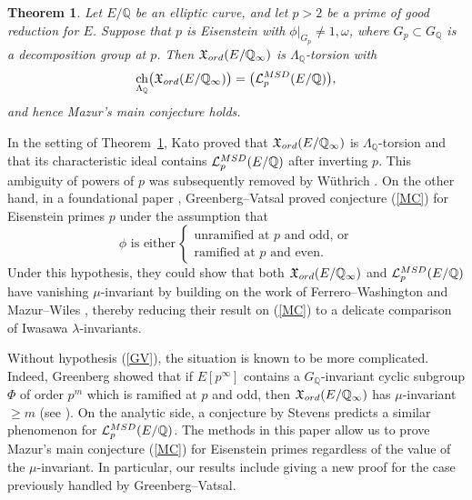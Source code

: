 \documentclass[a4paper,10pt]{amsart}
\numberwithin{equation}{section}
\numberwithin{equation}{section}
\theoremstyle{plain}
\theoremstyle{definition}
\theoremstyle{definition}
\theoremstyle{plain}
\theoremstyle{plain}
\theoremstyle{plain}
\theoremstyle{plain}
\newtheorem{thmintro}{Theorem}
\newcommand{\Q}{\mathbb{Q}}
\newcommand{\X}{\mathfrak{X}}
\DeclareMathOperator{\ch}{ch}
\newcommand{\Lcal}{\mathcal{L}}
\begin{document}

\begin{thmintro}\label{thm:CYC}
Let $E/\Q$ be an elliptic curve, and let $p>2$ be a prime of good reduction  for $E$. Suppose that $p$ is Eisenstein with 
$\phi\vert_{G_p}\neq 1,\omega$, 
where $G_p\subset G_\Q$ is a decomposition group at $p$. Then $\X_{\rm ord}(E/\Q_\infty)$ is $\Lambda_\Q$-torsion with
\[
\ch_{\Lambda_\Q}\bigl(\X_{\rm ord}(E/\Q_\infty)\bigr)\overset{}=\bigl(\Lcal_p^{\rm MSD}(E/\Q)\bigr),
\]
and hence Mazur's main conjecture holds.
\end{thmintro}


In the setting of Theorem~\ref{thm:CYC}, Kato proved \cite{kato-euler-systems} that $\X_{\rm ord}(E/\Q_\infty)$ is $\Lambda_\Q$-torsion and that its characteristic ideal contains $\Lcal_p^{\rm MSD}(E/\Q)$ after inverting $p$. This ambiguity of powers of $p$ was subsequently removed by W\"uthrich \cite{wuthrich-int}. On the other hand, in a foundational paper \cite{greenvats}, Greenberg--Vatsal proved conjecture (\ref{MC}) for Eisenstein primes $p$ under the assumption that
\begin{equation}\label{GV}
\textrm{$\phi$ is either}\,
\begin{cases}
\textrm{unramified at $p$ and odd, or} \\
\textrm{ramified at $p$ and even.}\tag{GV}
\end{cases}
\end{equation}
Under this hypothesis, they could show that both $\X_{\rm ord}(E/\Q_\infty)$ and $\Lcal_p^{\rm MSD}(E/\Q)$ have vanishing $\mu$-invariant by building on the work of Ferrero--Washington \cite{FW} and %
Mazur--Wiles \cite{MW}, thereby reducing their result on (\ref{MC}) to a delicate comparison of Iwasawa $\lambda$-invariants.

Without hypothesis (\ref{GV}), the situation is known to be more complicated. Indeed,  Greenberg showed that if $E[p^\infty]$ contains a $G_\Q$-invariant cyclic subgroup $\Phi$ of order $p^m$ which is ramified at $p$ and odd, then $\X_{\rm ord}(E/\Q_\infty)$ has $\mu$-invariant $\geq m$ (see \cite[Prop.~5.7]{greenberg-cetraro}). On the analytic side, a conjecture by Stevens \cite{stevens-invmath} predicts a similar phenomenon for $\Lcal_p^{\rm MSD}(E/\Q)$.
The methods in this paper allow us to prove Mazur's main conjecture (\ref{MC}) for Eisenstein primes regardless of the value of the $\mu$-invariant. In particular, our results include giving a new proof for the case previously handled by Greenberg--Vatsal.
\end{document}
